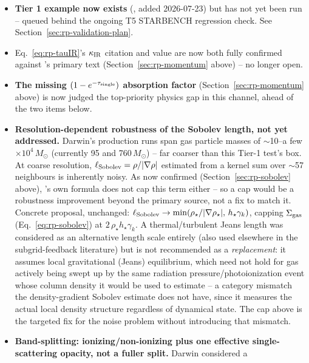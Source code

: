 \begin{itemize}
  \item \textbf{Tier 1 example now exists}
    (,
    added 2026-07-23) but has not yet been run -- queued behind the
    ongoing T5 STARBENCH regression check. See
    Section~\ref{sec:rp-validation-plan}.
  \item Eq.~\ref{eq:rp-tauIR}'s $\kappa_{\rm IR}$ citation and value are
    now both fully confirmed against \citet{Hopkins2020}'s primary text
    (Section~\ref{sec:rp-momentum} above) -- no longer open.
  \item \textbf{The missing $(1-e^{-\tau_{\rm single}})$ absorption
    factor} (Section~\ref{sec:rp-momentum} above) is now judged the
    top-priority physics gap in this channel, ahead of the two items
    below.
  \item \textbf{Resolution-dependent robustness of the Sobolev length,
    not yet addressed.} Darwin's production runs span gas particle
    masses of $\sim$10--a few $\times10^4\,M_\odot$ (currently 95 and
    760\,$M_\odot$) -- far coarser than this Tier-1 test's box. At coarse
    resolution, $\ell_{\rm Sobolev}=\rho/|\nabla\rho|$ estimated from a
    kernel sum over $\sim$57 neighbours is inherently noisy. As now
    confirmed (Section~\ref{sec:rp-sobolev} above),
    \citet{Hopkins2020}'s own formula does not cap this term either --
    so a cap would be a robustness improvement beyond the primary
    source, not a fix to match it. Concrete proposal, unchanged:
    $\ell_{\rm Sobolev} \to \min(\rho_\star/|\nabla\rho_\star|,\,
    h_\star\gamma_k)$, capping $\Sigma_{\rm gas}$
    (Eq.~\ref{eq:rp-sobolev}) at $2\,\rho_\star h_\star\gamma_k$. A
    thermal/turbulent Jeans length was considered as an alternative
    length scale entirely (also used elsewhere in the subgrid-feedback
    literature) but is not recommended as a \emph{replacement}: it
    assumes local gravitational (Jeans) equilibrium, which need not hold
    for gas actively being swept up by the same radiation
    pressure/photoionization event whose column density it would be
    used to estimate -- a category mismatch the density-gradient Sobolev
    estimate does not have, since it measures the actual local density
    structure regardless of dynamical state. The cap above is the
    targeted fix for the noise problem without introducing that
    mismatch.
  \item \textbf{Band-splitting: ionizing/non-ionizing plus one effective
    single-scattering opacity, not a fuller split.} Darwin considered a

\end{itemize}

